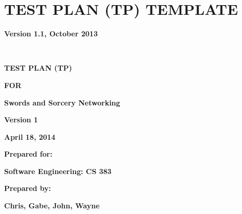\chapter{TEST PLAN (TP) TEMPLATE}

{\centering{}\bfseries\color{black}
Version 1.1, October 2013
\par}

\ 


\bigskip

{\centering\bfseries\color{black}
TEST PLAN (TP)}

{\centering{}\bfseries\color{black}
FOR
\par}


\bigskip

{\centering{}\bfseries\color{black}
Swords and Sorcery Networking 
\par}


\bigskip


\bigskip


\bigskip

\begin{figure}
\centering
\end{figure}

\bigskip


\bigskip


\bigskip


\bigskip

{\centering{}\bfseries\color{black}
Version 1
\par}

{\centering{}\bfseries\color{black}
April 18, 2014
\par}


\bigskip


\bigskip

{\centering{}\bfseries\color{black}
Prepared for:
\par}

{\centering{}\bfseries\color{black}
Software Engineering: CS 383
\par}


\bigskip


\bigskip

{\centering{}\bfseries\color{black}
Prepared by:
\par}

{\centering{}\bfseries\color{black}
Chris, Gabe, John, Wayne
\par}

